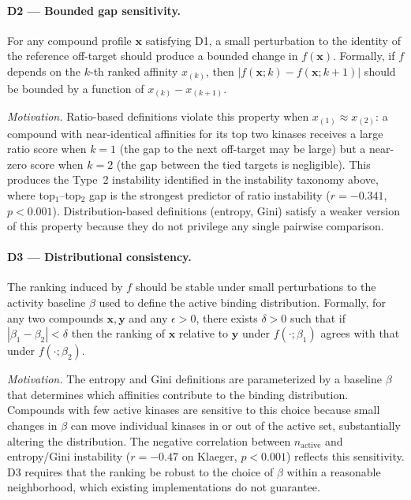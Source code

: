 \documentclass[journal=jcisd8,manuscript=article]{achemso}
\begin{document}
\paragraph{D2 --- Bounded gap sensitivity.}
For any compound profile $\mathbf{x}$ satisfying D1, a small perturbation to
the identity of the reference off-target should produce a bounded change in
$f(\mathbf{x})$.
Formally, if $f$ depends on the $k$-th ranked affinity $x_{(k)}$, then
$|f(\mathbf{x}; k) - f(\mathbf{x}; k+1)|$ should be bounded by a function of
$x_{(k)} - x_{(k+1)}$.

\textit{Motivation.}
Ratio-based definitions violate this property when $x_{(1)} \approx x_{(2)}$:
a compound with near-identical affinities for its top two kinases receives a
large ratio score when $k=1$ (the gap to the next off-target may be large) but
a near-zero score when $k=2$ (the gap between the tied targets is negligible).
This produces the Type~2 instability identified in
the instability taxonomy above, where top$_1$--top$_2$ gap is the
strongest predictor of ratio instability ($r = -0.341$, $p < 0.001$).
Distribution-based definitions (entropy, Gini) satisfy a weaker version of
this property because they do not privilege any single pairwise comparison.

\paragraph{D3 --- Distributional consistency.}
The ranking induced by $f$ should be stable under small perturbations to the
activity baseline $\beta$ used to define the active binding distribution.
Formally, for any two compounds $\mathbf{x}, \mathbf{y}$ and any
$\epsilon > 0$, there exists $\delta > 0$ such that if $|\beta_1 - \beta_2|
< \delta$ then the ranking of $\mathbf{x}$ relative to $\mathbf{y}$ under
$f(\cdot; \beta_1)$ agrees with that under $f(\cdot; \beta_2)$.

\textit{Motivation.}
The entropy and Gini definitions are parameterized by a baseline $\beta$ that
determines which affinities contribute to the binding distribution.
Compounds with few active kinases are sensitive to this choice because small
changes in $\beta$ can move individual kinases in or out of the active set,
substantially altering the distribution.
The negative correlation between $n_\mathrm{active}$ and entropy/Gini
instability ($r = -0.47$ on Klaeger, $p < 0.001$) reflects this sensitivity.
D3 requires that the ranking be robust to the choice of $\beta$ within a
reasonable neighborhood, which existing implementations do not guarantee.
\end{document}
